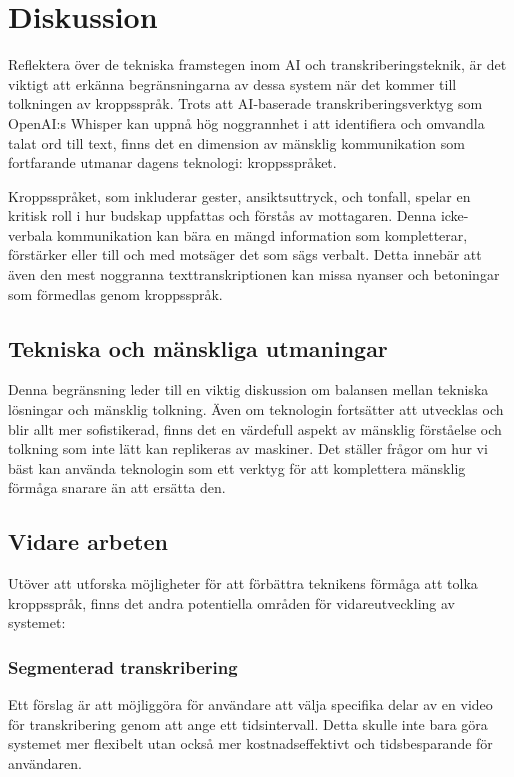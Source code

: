 \chapter{Diskussion}
Reflektera över de tekniska framstegen inom AI och transkriberingsteknik, är
det viktigt att erkänna begränsningarna av dessa system när det kommer till
tolkningen av kroppsspråk. Trots att AI-baserade transkriberingsverktyg som
OpenAI:s Whisper kan uppnå hög noggrannhet i att identifiera och omvandla
talat ord till text, finns det en dimension av mänsklig kommunikation som
fortfarande utmanar dagens teknologi: kroppsspråket.

Kroppsspråket, som inkluderar gester, ansiktsuttryck, och tonfall, spelar en
kritisk roll i hur budskap uppfattas och förstås av mottagaren. Denna
icke-verbala kommunikation kan bära en mängd information som kompletterar,
förstärker eller till och med motsäger det som sägs verbalt. Detta innebär att
även den mest noggranna texttranskriptionen kan missa nyanser och betoningar
som förmedlas genom kroppsspråk.

\section{Tekniska och mänskliga utmaningar}
Denna begränsning leder till en viktig diskussion om balansen mellan tekniska
lösningar och mänsklig tolkning. Även om teknologin fortsätter att utvecklas
och blir allt mer sofistikerad, finns det en värdefull aspekt av mänsklig
förståelse och tolkning som inte lätt kan replikeras av maskiner. Det ställer
frågor om hur vi bäst kan använda teknologin som ett verktyg för att
komplettera mänsklig förmåga snarare än att ersätta den.

\section{Vidare arbeten}
Utöver att utforska möjligheter för att förbättra teknikens förmåga att tolka
kroppsspråk, finns det andra potentiella områden för vidareutveckling av
systemet:

\subsection{Segmenterad transkribering}
Ett förslag är att möjliggöra för användare att
välja specifika delar av en video för transkribering genom att ange ett
tidsintervall. Detta skulle inte bara göra systemet mer flexibelt utan också
mer kostnadseffektivt och tidsbesparande för användaren.

